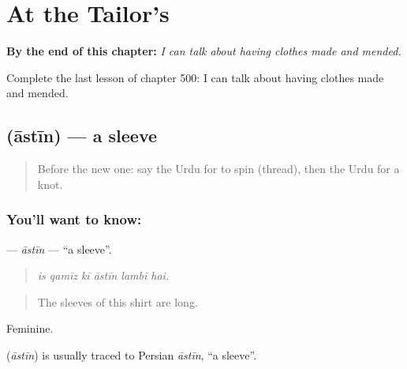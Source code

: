 
\chapter{At the Tailor's}
\label{ch:ur-at-the-tailor-s}

\begin{chapteropening}
\textbf{By the end of this chapter:} \emph{I can talk about having clothes made and mended.}

Complete the last lesson of chapter 500: I can talk about having clothes made and mended.
\end{chapteropening}

\section[\texorpdfstring{\ur{آستین} (āstīn)}{آستین (āstīn)}]{ (āstīn) — a sleeve}

\label{lesson:UR-C500-astin}



\begin{quote}
Before the new one: say the Urdu for to spin (thread), then the Urdu for a knot.
\end{quote}

\subsection*{You'll want to know: }
\textbf{} — \emph{āstīn} — \textquotedblleft{}a sleeve\textquotedblright{}.

\begin{quote}
     
\end{quote}

\begin{quote}
\emph{is qamīz kī āstīn lambī hai.}
\end{quote}

\begin{quote}
The sleeves of this shirt are long.
\end{quote}

Feminine.

\begin{cousinweb}
\textbf{} (\emph{āstīn}) is usually traced to Persian \emph{āstīn}, \textquotedblleft{}a sleeve\textquotedblright{}.
\end{cousinweb}

